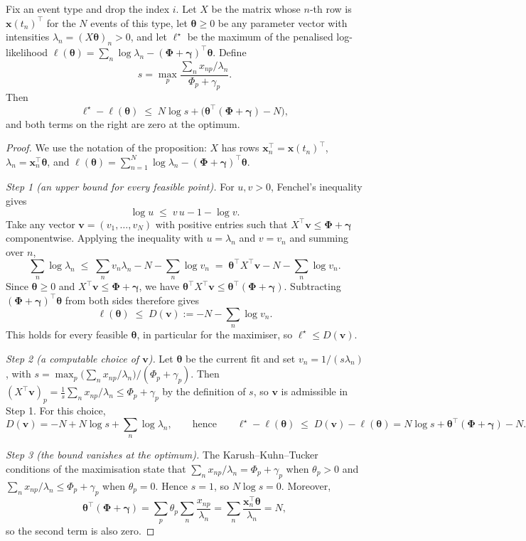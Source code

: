 \begin{proposition}\label{prop:gap}
Fix an event type and drop the index $i$. Let $X$ be the matrix whose $n$-th row is
$\bm x(t_n)^\top$ for the $N$ events of this type, let $\bm\theta\ge0$ be any parameter vector with
intensities $\lambda_n=(X\bm\theta)_n>0$, and let $\ell^\star$ be the maximum of the penalised
log-likelihood $\ell(\bm\theta)=\sum_n\log\lambda_n-(\bm\Phi+\bm\gamma)^\top\bm\theta$. Define
\[
s=\max_p\frac{\sum_n x_{np}/\lambda_n}{\Phi_p+\gamma_p}.
\]
Then
\[
\ell^\star-\ell(\bm\theta)\;\le\;N\log s+\bigl(\bm\theta^\top(\bm\Phi+\bm\gamma)-N\bigr),
\]
and both terms on the right are zero at the optimum.
\end{proposition}
\begin{proof}
We use the notation of the proposition: $X$ has rows $\bm x_n^\top=\bm x(t_n)^\top$,
$\lambda_n=\bm x_n^\top\bm\theta$, and
$\ell(\bm\theta)=\sum_{n=1}^{N}\log\lambda_n-(\bm\Phi+\bm\gamma)^\top\bm\theta$.

\emph{Step 1 (an upper bound for every feasible point).} For $u,v>0$, Fenchel's inequality gives
\[
\log u\;\le\;v\,u-1-\log v .
\]
Take any vector $\bm v=(v_1,\dots,v_N)$ with positive entries such that
$X^\top\bm v\le\bm\Phi+\bm\gamma$ componentwise. Applying the inequality with $u=\lambda_n$ and
$v=v_n$ and summing over $n$,
\[
\sum_{n}\log\lambda_n\;\le\;\sum_n v_n\lambda_n-N-\sum_n\log v_n
\;=\;\bm\theta^\top X^\top\bm v-N-\sum_n\log v_n .
\]
Since $\bm\theta\ge0$ and $X^\top\bm v\le\bm\Phi+\bm\gamma$, we have
$\bm\theta^\top X^\top\bm v\le\bm\theta^\top(\bm\Phi+\bm\gamma)$. Subtracting
$(\bm\Phi+\bm\gamma)^\top\bm\theta$ from both sides therefore gives
\[
\ell(\bm\theta)\;\le\;D(\bm v):=-N-\sum_n\log v_n .
\]
This holds for every feasible $\bm\theta$, in particular for the maximiser, so
$\ell^\star\le D(\bm v)$.

\emph{Step 2 (a computable choice of $\bm v$).} Let $\bm\theta$ be the current fit and set
$v_n=1/(s\lambda_n)$, with $s=\max_p\bigl(\sum_n x_{np}/\lambda_n\bigr)/(\Phi_p+\gamma_p)$. Then
$(X^\top\bm v)_p=\frac{1}{s}\sum_n x_{np}/\lambda_n\le\Phi_p+\gamma_p$ by the definition of $s$, so
$\bm v$ is admissible in Step 1. For this choice,
\[
D(\bm v)=-N+N\log s+\sum_n\log\lambda_n ,
\qquad\text{hence}\qquad
\ell^\star-\ell(\bm\theta)\;\le\;D(\bm v)-\ell(\bm\theta)=N\log s+\bm\theta^\top(\bm\Phi+\bm\gamma)-N .
\]

\emph{Step 3 (the bound vanishes at the optimum).} The Karush--Kuhn--Tucker conditions of the
maximisation state that $\sum_n x_{np}/\lambda_n=\Phi_p+\gamma_p$ when $\theta_p>0$ and
$\sum_n x_{np}/\lambda_n\le\Phi_p+\gamma_p$ when $\theta_p=0$. Hence $s=1$, so $N\log s=0$. Moreover,
\[
\bm\theta^\top(\bm\Phi+\bm\gamma)=\sum_p\theta_p\sum_n\frac{x_{np}}{\lambda_n}
=\sum_n\frac{\bm x_n^\top\bm\theta}{\lambda_n}=N ,
\]
so the second term is also zero.
\end{proof}

